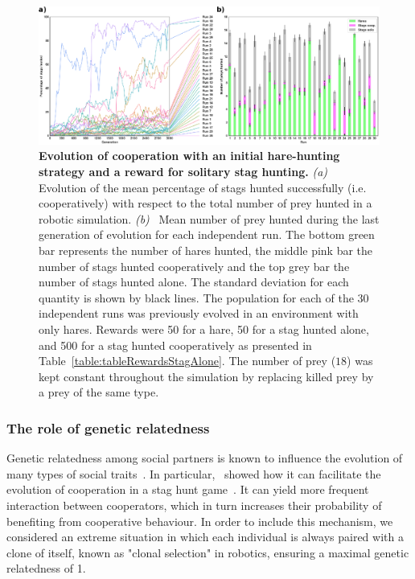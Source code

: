       \begin{figure}[hbtp]
        \centering
          \includegraphics[scale = 1]{fig/ArticleBio1/Fig6.eps}
        \caption{\textbf{Evolution of cooperation with an initial hare-hunting strategy and a reward for solitary stag hunting.}
        {\em (a)}~ Evolution of the mean percentage of stags hunted successfully (i.e. cooperatively) with respect to the total number of prey hunted in a robotic simulation. {\em (b)}~ Mean number of prey hunted during the last generation of evolution for each independent run. The bottom green bar represents the number of hares hunted, the middle pink bar the number of stags hunted cooperatively and the top grey bar the number of stags hunted alone. The standard deviation for each quantity is shown by black lines. The population for each of the 30 independent runs was previously evolved in an environment with only hares. Rewards were 50 for a hare, 50 for a stag hunted alone, and 500 for a stag hunted cooperatively as presented in Table~\ref{table:tableRewardsStagAlone}. The number of prey ($18$) was kept constant throughout the simulation by replacing killed prey by a prey of the same type.}
        \label{fig:graphSolo}
      \end{figure}


    \subsubsection{The role of genetic relatedness}
      Genetic relatedness among social partners is known to influence the evolution of many types of social traits~\parencite{Hamilton1964}. In particular,~\parencite{Skyrms2004} showed how it can facilitate the evolution of cooperation in a stag hunt game~\cite[chapter 3]{Skyrms2004}. It can yield more frequent interaction between cooperators, which in turn increases their probability of benefiting from cooperative behaviour. In order to include this mechanism, we considered an extreme situation in which each individual is always paired with a clone of itself, known as "clonal selection" in robotics, ensuring a maximal genetic relatedness of 1.

